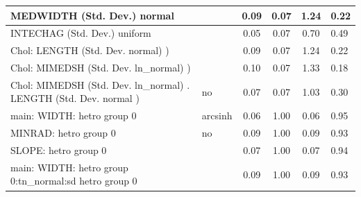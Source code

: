 \begin{table}
\begin{center}
\begin{tabular}{|l|l|c|c|c|l|}
			\hline
			MEDWIDTH (Std. Dev.) normal &  & 0.09 & 0.07 & 1.24 & 0.22 \\
			\hline
			INTECHAG (Std. Dev.) uniform &  & 0.05 & 0.07 & 0.70 & 0.49 \\
			\hline
			 Chol: LENGTH (Std. Dev. normal) ) &  & 0.09 & 0.07 & 1.24 & 0.22 \\
			\hline
			 Chol: MIMEDSH (Std. Dev. ln_normal) ) &  & 0.10 & 0.07 & 1.33 & 0.18 \\
			\hline
			 Chol: MIMEDSH (Std. Dev. ln_normal) . LENGTH (Std. Dev.   normal ) & no & 0.07 & 0.07 & 1.03 & 0.30 \\
			\hline
			main: WIDTH: hetro group 0 & arcsinh & 0.06 & 1.00 & 0.06 & 0.95 \\
			\hline
			MINRAD: hetro group 0 & no & 0.09 & 1.00 & 0.09 & 0.93 \\
			\hline
			SLOPE: hetro group 0 &  & 0.07 & 1.00 & 0.07 & 0.94 \\
			\hline
			main: WIDTH: hetro group 0:tn_normal:sd  hetro group 0 &  & 0.09 & 1.00 & 0.09 & 0.93 \\
			\hline
		\end{tabular}
	\end{center}
\end{table}